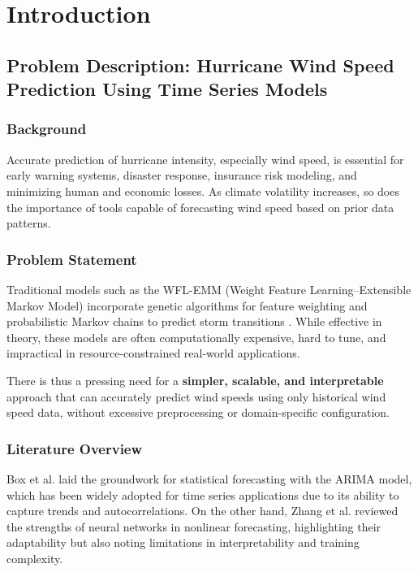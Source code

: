 %
%

\chapter{Introduction}

\section{Problem Description: Hurricane Wind Speed Prediction Using Time Series Models}

\subsection{Background}
Accurate prediction of hurricane intensity, especially wind speed, is essential for early warning systems, disaster response, insurance risk modeling, and minimizing human and economic losses. As climate volatility increases, so does the importance of tools capable of forecasting wind speed based on prior data patterns.

\subsection{Problem Statement}
Traditional models such as the WFL-EMM (Weight Feature Learning–Extensible Markov Model) incorporate genetic algorithms for feature weighting and probabilistic Markov chains to predict storm transitions \cite{su2011hurricane}. While effective in theory, these models are often computationally expensive, hard to tune, and impractical in resource-constrained real-world applications.

There is thus a pressing need for a \textbf{simpler, scalable, and interpretable} approach that can accurately predict wind speeds using only historical wind speed data, without excessive preprocessing or domain-specific configuration.

\subsection{Literature Overview}
Box et al. \cite{box2015time} laid the groundwork for statistical forecasting with the ARIMA model, which has been widely adopted for time series applications due to its ability to capture trends and autocorrelations. On the other hand, Zhang et al. \cite{zhang2001forecasting} reviewed the strengths of neural networks in nonlinear forecasting, highlighting their adaptability but also noting limitations in interpretability and training complexity.

